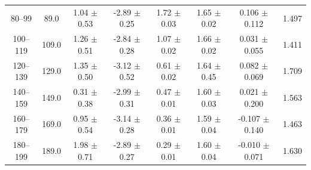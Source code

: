 \begin{table}[htbp]
\begin{tabular}{c c c c c c c c}
80--99 & 89.0 & 1.04 $\pm$ 0.53 & -2.89 $\pm$ 0.25 & 1.72 $\pm$ 0.03 & 1.65 $\pm$ 0.02 & 0.106 $\pm$ 0.112 & 1.497 \\
100--119 & 109.0 & 1.26 $\pm$ 0.51 & -2.84 $\pm$ 0.28 & 1.07 $\pm$ 0.02 & 1.66 $\pm$ 0.02 & 0.031 $\pm$ 0.055 & 1.411 \\
120--139 & 129.0 & 1.35 $\pm$ 0.50 & -3.12 $\pm$ 0.52 & 0.61 $\pm$ 0.02 & 1.64 $\pm$ 0.45 & 0.082 $\pm$ 0.069 & 1.709 \\
140--159 & 149.0 & 0.31 $\pm$ 0.38 & -2.99 $\pm$ 0.31 & 0.47 $\pm$ 0.01 & 1.60 $\pm$ 0.03 & 0.021 $\pm$ 0.200 & 1.563 \\
160--179 & 169.0 & 0.95 $\pm$ 0.54 & -3.14 $\pm$ 0.28 & 0.36 $\pm$ 0.01 & 1.59 $\pm$ 0.04 & -0.107 $\pm$ 0.140 & 1.463 \\
180--199 & 189.0 & 1.98 $\pm$ 0.71 & -2.89 $\pm$ 0.27 & 0.29 $\pm$ 0.01 & 1.60 $\pm$ 0.04 & -0.010 $\pm$ 0.071 & 1.630 \\
\hline\hline
\end{tabular}
\end{table}